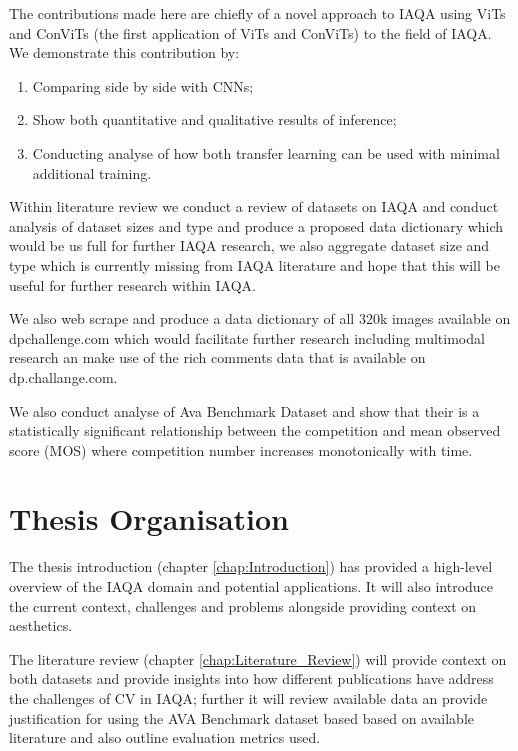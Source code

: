 The contributions made here are chiefly of a novel approach to IAQA using ViTs and ConViTs (the first application of ViTs and ConViTs) to the field of IAQA. We demonstrate this contribution by:\begin{enumerate}
\item Comparing side by side with CNNs;
\item Show both quantitative and qualitative results of inference;
\item Conducting analyse of how both transfer learning can be used with minimal additional training.
\end{enumerate}

Within literature review we conduct a review of datasets on IAQA and conduct analysis of dataset sizes and type and produce a proposed data dictionary which would be us full for further IAQA research, we also aggregate dataset size and type which is currently missing from IAQA literature and hope that this will be useful for further research within IAQA. 

We also web scrape and produce a data dictionary of all 320k images available on dpchallenge.com which would facilitate further research including multimodal research an make use of the rich comments data that is available on dp.challange.com.

We also conduct analyse of Ava Benchmark Dataset and show that their is a statistically significant relationship between the competition and mean observed score (MOS) where competition number increases monotonically with time. 

\section{Thesis Organisation}

The thesis introduction (chapter \ref{chap:Introduction}) has provided a high-level overview of the IAQA domain and potential applications. It will also introduce the current context, challenges and problems alongside providing context on aesthetics. 

\par The literature review (chapter \ref{chap:Literature_Review}) will provide context on both datasets and provide insights into how different publications have address the challenges of CV in IAQA; further it will review available data an provide justification for using the AVA Benchmark dataset based based on available literature and also outline evaluation metrics used.

